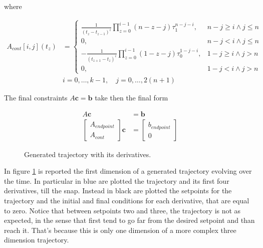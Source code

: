 \noindent where

\begin{align}
	A_{cont}[i,j](t_z) &=
	\begin{cases}
		\frac{1}{(t_z-t_{z-1})^i}\prod\limits_{z=0}^{i-1}(n-z-j)\tau_1^{n-j-i}, & n-j\ge i\wedge j\le n \\
		0,                                                                       & n-j<i\wedge j\le n   \\
		-\frac{1}{(t_{z+1}-t_z)^i}\prod\limits_{z=0}^{i-1}(1-z-j)\tau_0^{1-j-i}, & 1-j\ge i\wedge j>n   \\
		0,                                                                       & 1-j<i\wedge j>n      
	\end{cases} \\
	& i=0,\dots,k-1,\quad j=0,\dots,2(n+1) \nonumber 
\end{align}

\noindent The final constraints $A\mathbf{c}=\mathbf{b}$ take then the final form

\begin{align} 
	A\mathbf{c} &= \mathbf{b} \\
	\begin{bmatrix}
		A_{endpoint} \\
		A_{cont}
	\end{bmatrix}
	\mathbf{c} &=
	\begin{bmatrix}
		b_{endpoint} \\
		0
	\end{bmatrix} \nonumber	
\end{align}

\begin{figure}[h]
	\centering
 	
 	
 	\caption{Generated trajectory with its derivatives.}
 	\label{fig:polyTrajectory}		
\end{figure}

\noindent In figure \ref{fig:polyTrajectory} is reported the first dimension of a generated trajectory evolving over the time. In particular in blue are plotted the trajectory and its first four derivatives, till the snap. Instead in black are plotted the setpoints for the trajectory and the initial and final conditions for each derivative, that are equal to zero. Notice that between setpoints two and three, the trajectory is not as expected, in the sense that first tend to go far from the desired setpoint and than reach it. That's because this is only one dimension of a more complex three dimension trajectory.

